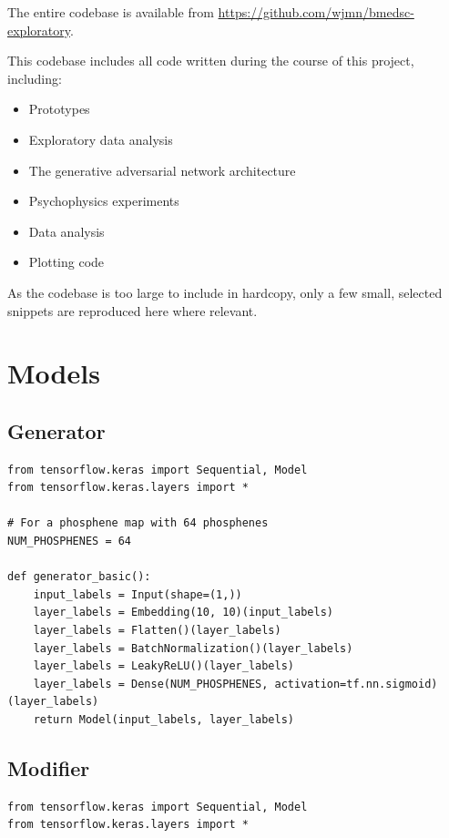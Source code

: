 \documentclass[a4paper,11pt,openany]{book}
\begin{document}
\begin{appendices}
The entire codebase is available from \url{https://github.com/wjmn/bmedsc-exploratory}.

This codebase includes all code written during the course of this project, including:
\begin{itemize}
\item Prototypes
\item Exploratory data analysis
\item The generative adversarial network architecture
\item Psychophysics experiments
\item Data analysis
\item Plotting code
\end{itemize}

As the codebase is too large to include in hardcopy, only a few small, selected snippets are reproduced here where relevant.

\section*{Models}
\label{sec:org5a791f1}

\subsection*{Generator}
\label{sec:org6f4d288}

\begin{small}
\begin{verbatim}
from tensorflow.keras import Sequential, Model
from tensorflow.keras.layers import *

# For a phosphene map with 64 phosphenes
NUM_PHOSPHENES = 64

def generator_basic():
    input_labels = Input(shape=(1,))
    layer_labels = Embedding(10, 10)(input_labels)
    layer_labels = Flatten()(layer_labels)
    layer_labels = BatchNormalization()(layer_labels)
    layer_labels = LeakyReLU()(layer_labels)
    layer_labels = Dense(NUM_PHOSPHENES, activation=tf.nn.sigmoid)(layer_labels)
    return Model(input_labels, layer_labels)
\end{verbatim}
\end{small}

\subsection*{Modifier}
\label{sec:org1ce59bf}

\begin{small}
\begin{verbatim}
from tensorflow.keras import Sequential, Model
from tensorflow.keras.layers import *


\end{verbatim}
\end{small}
\end{appendices}
\end{document}
